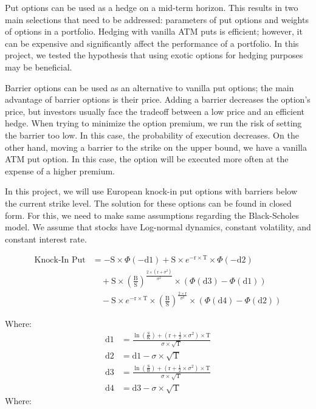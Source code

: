 \documentclass[12pt]{article}
\begin{document}
{{\qquad Put options can be used as a hedge on a mid-term horizon. This results in two main selections that need to be addressed: parameters of put options and weights of options in a portfolio. Hedging with vanilla ATM puts is efficient; however, it can be expensive and significantly affect the performance of a portfolio. In this project, we tested the hypothesis that using exotic options for hedging purposes may be beneficial.

\qquad Barrier options can be used as an alternative to vanilla put options; the main advantage of barrier options is their price. Adding a barrier decreases the option's price, but investors usually face the tradeoff between a low price and an efficient hedge. When trying to minimize the option premium, we run the risk of setting the barrier too low. In this case, the probability of execution decreases. On the other hand, moving a barrier to the strike on the upper bound, we have a vanilla ATM put option. In this case, the option will be executed more often at the expense of a higher premium.

\qquad In this project, we will use European knock-in put options with barriers below the current strike level. The solution for these options can be found in closed form. For this, we need to make same assumptions regarding the Black-Scholes model. We assume that stocks have Log-normal dynamics, constant volatility, and constant interest rate. 

\begin{equation}
\begin{aligned}
\text{Knock-In Put} &= -\text{S} \times \Phi (-\text{d1}) + \text{S} \times e^{-\text{r} \times \text{T}} \times \Phi(-\text{d2}) \\
&\quad + \text{S} \times \left(\frac{\text{B}}{\text{S}}\right)^{\frac{2 \times (\text{r} + \sigma^2)}{\sigma^2}} \times \left(\Phi(\text{d3}) - \Phi(\text{d1})\right) \\
&\quad - \text{S} \times e^{-\text{r} \times \text{T}} \times \left(\frac{\text{B}}{\text{S}}\right)^{\frac{2 \times \text{r}}{\sigma^2}} \times \left(\Phi(\text{d4}) - \Phi(\text{d2})\right)
\end{aligned}
\end{equation}

Where:
\begin{align*}
\text{d1} &= \frac{\ln\left(\frac{\text{S}}{\text{K}}\right) + \left(\text{r} + \frac{1}{2} \times \sigma^2\right) \times \text{T}}{\sigma \times \sqrt{\text{T}}} \\
\text{d2} &= \text{d1} - \sigma \times \sqrt{\text{T}} \\
\text{d3} &= \frac{\ln\left(\frac{\text{S}}{\text{B}}\right) + \left(\text{r} + \frac{1}{2} \times \sigma^2\right) \times \text{T}}{\sigma \times \sqrt{\text{T}}} \\
\text{d4} &= \text{d3} - \sigma \times \sqrt{\text{T}}
\end{align*}
\qquad Where:

}}
\end{document}
